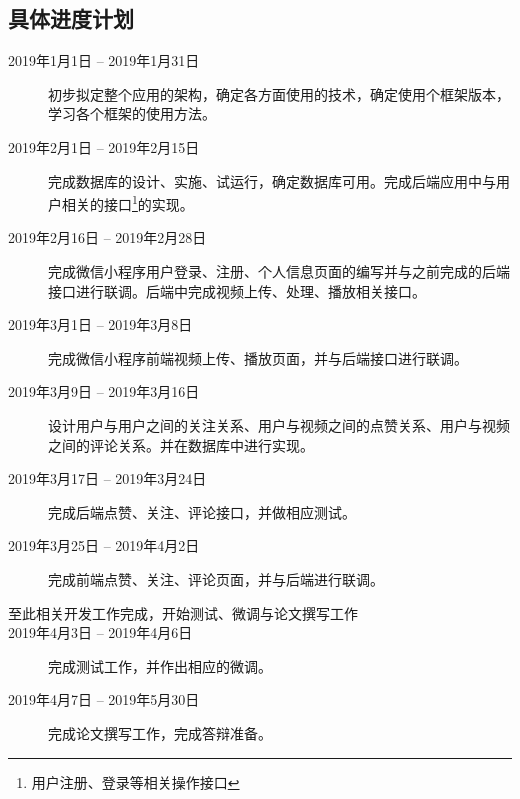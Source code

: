 \documentclass[a4paper, 12pt, UTF8]{ctexart}
\begin{document}
	\subsection{具体进度计划}
	\begin{description}
		\item[2019年1月1日 -- 2019年1月31日] 初步拟定整个应用的架构，确定各方面使用的技术，确定使用个框架版本，学习各个框架的使用方法。
		\item[2019年2月1日 -- 2019年2月15日] 完成数据库的设计、实施、试运行，确定数据库可用。完成后端应用中与用户相关的接口\footnote{用户注册、登录等相关操作接口}的实现。
		\item[2019年2月16日 -- 2019年2月28日] 完成微信小程序用户登录、注册、个人信息页面的编写并与之前完成的后端接口进行联调。后端中完成视频上传、处理、播放相关接口。
		\item[2019年3月1日 -- 2019年3月8日] 完成微信小程序前端视频上传、播放页面，并与后端接口进行联调。
		\item[2019年3月9日 -- 2019年3月16日] 设计用户与用户之间的关注关系、用户与视频之间的点赞关系、用户与视频之间的评论关系。并在数据库中进行实现。
		\item[2019年3月17日 -- 2019年3月24日] 完成后端点赞、关注、评论接口，并做相应测试。
		\item[2019年3月25日 -- 2019年4月2日] 完成前端点赞、关注、评论页面，并与后端进行联调。
		\item[至此相关开发工作完成，开始测试、微调与论文撰写工作]
		\item[2019年4月3日 -- 2019年4月6日] 完成测试工作，并作出相应的微调。
		\item[2019年4月7日 -- 2019年5月30日] 完成论文撰写工作，完成答辩准备。
	\end{description}



	
	

	\printbibliography[heading=bibliography,title=参考文献]
	
\end{document}
